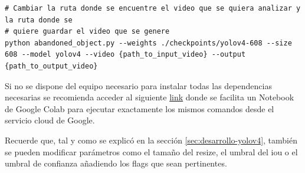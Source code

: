 \vspace{0.5cm}
\begin{lstlisting}[language=iPython,caption=Ejecutar script detección de objetos abandonados con YOLOv4 y Deep SORT,captionpos=b,label={lst:ejecutar-yolov4-abandoned-object}]
# Cambiar la ruta donde se encuentre el video que se quiera analizar y la ruta donde se
# quiere guardar el video que se genere
python abandoned_object.py --weights ./checkpoints/yolov4-608 --size 608 --model yolov4 --video {path_to_input_video} --output {path_to_output_video}
\end{lstlisting}

Si no se dispone del equipo necesario para instalar todas las dependencias necesarias se recomienda acceder al siguiente \href{https://colab.research.google.com/drive/18vL9LH8e9VaimA9LzBD35Cn4AOm6C17I?usp=sharing}{link} donde se facilita un Notebook de Google Colab para ejecutar exactamente los mismos comandos desde el servicio cloud de Google.

Recuerde que, tal y como se explicó en la sección \ref{sec:desarrollo-yolov4}, también se pueden modificar parámetros como el tamaño del resize, el umbral del \gls{iou} o el umbral de confianza añadiendo los flags que sean pertinentes.
